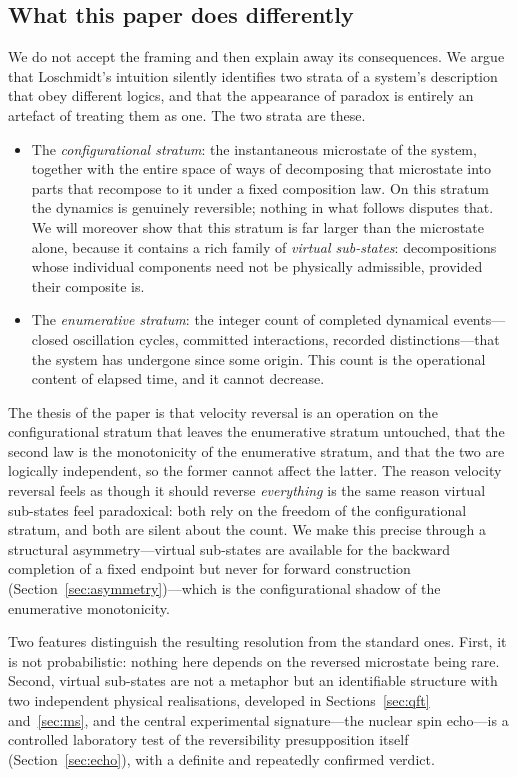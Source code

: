 \documentclass[11pt,a4paper]{article}
\theoremstyle{thmstyle}
\theoremstyle{definition}
\theoremstyle{remark}
\begin{document}
\subsection{What this paper does differently}
\label{sec:different}

We do not accept the framing and then explain away its consequences.
We argue that Loschmidt's intuition silently identifies two strata of a
system's description that obey different logics, and that the appearance
of paradox is entirely an artefact of treating them as one. The two
strata are these.

\begin{itemize}[leftmargin=1.4em]
\item The \emph{configurational stratum}: the instantaneous microstate
of the system, together with the entire space of ways of decomposing
that microstate into parts that recompose to it under a fixed
composition law. On this stratum the dynamics is genuinely reversible;
nothing in what follows disputes that. We will moreover show that this
stratum is far larger than the microstate alone, because it contains a
rich family of \emph{virtual sub-states}: decompositions whose individual
components need not be physically admissible, provided their composite
is.

\item The \emph{enumerative stratum}: the integer count of completed
dynamical events---closed oscillation cycles, committed interactions,
recorded distinctions---that the system has undergone since some origin.
This count is the operational content of elapsed time, and it cannot
decrease.
\end{itemize}

The thesis of the paper is that velocity reversal is an operation on the
configurational stratum that leaves the enumerative stratum untouched,
that the second law is the monotonicity of the enumerative stratum, and
that the two are logically independent, so the former cannot affect the
latter. The reason velocity reversal feels as though it should reverse
\emph{everything} is the same reason virtual sub-states feel paradoxical:
both rely on the freedom of the configurational stratum, and both are
silent about the count. We make this precise through a structural
asymmetry---virtual sub-states are available for the backward completion
of a fixed endpoint but never for forward construction
(Section~\ref{sec:asymmetry})---which is the configurational shadow of
the enumerative monotonicity.

Two features distinguish the resulting resolution from the standard ones.
First, it is not probabilistic: nothing here depends on the reversed
microstate being rare. Second, virtual sub-states are not a metaphor but
an identifiable structure with two independent physical realisations,
developed in Sections~\ref{sec:qft} and~\ref{sec:ms}, and the central
experimental signature---the nuclear spin echo---is a controlled
laboratory test of the reversibility presupposition itself
(Section~\ref{sec:echo}), with a definite and repeatedly confirmed
verdict.
\end{document}
